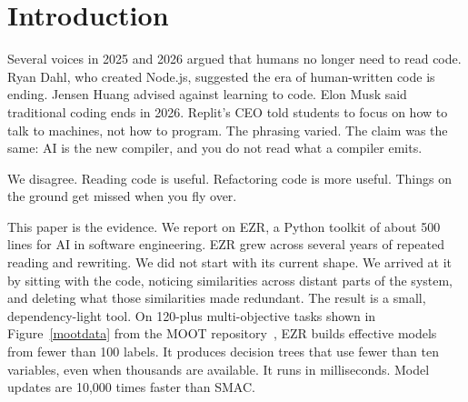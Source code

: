 \documentclass[AMA,STIX2COL]{WileyNJDv5}
\newcommand{\IT}{{\sffamily EZR}}
\begin{document}
\maketitle
\section{Introduction}
\label{sec:intro}

Several voices in 2025 and 2026 argued that humans no longer need
to read code. Ryan Dahl, who created Node.js, suggested the era
of human-written code is ending. Jensen Huang advised against
learning to code. Elon Musk said traditional coding ends in 2026.
Replit's CEO told students to focus on how to talk to machines,
not how to program. The phrasing varied. The claim was the same:
AI is the new compiler, and you do not read what a compiler
emits.

We disagree. Reading code is useful. Refactoring code is more
useful. Things on the ground get missed when you fly over.

This paper is the evidence. We report on \IT{}, a Python toolkit
of about 500 lines for AI in software engineering. \IT{} grew
across several years of repeated reading and rewriting. We did
not start with its current shape. We arrived at it by sitting
with the code, noticing similarities across distant parts of the
system, and deleting what those similarities made redundant. The
result is a small, dependency-light tool. On 120-plus
multi-objective tasks  shown in
Figure~\ref{mootdata} from the MOOT
repository~\cite{menzies2025moot}, \IT{} builds effective models
from fewer than 100 labels. It produces decision trees that use
fewer than ten variables, even when thousands are available. It
runs in milliseconds. Model updates are 10{,}000 times faster
than SMAC.
\end{document}
